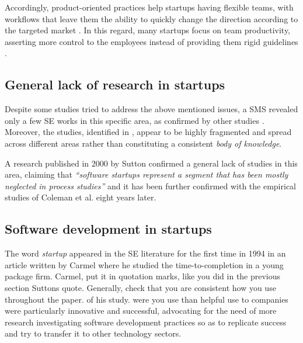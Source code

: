 \documentclass[12pt,journal,compsoc]{../sty/IEEEtran}
\begin{document}
Accordingly, product-oriented practices help startups having flexible teams,
with workflows that leave them the ability to quickly change the direction
according to the targeted market  \cite{Heitlager2007,Sutton2000}. In this
regard, many startups focus on team productivity, asserting more control to the
employees instead of providing them rigid guidelines \cite{Tanabian2005,
Chorev2006, Kakati2003}.

\subsection{General lack of research in startups} Despite some studies tried to
address the above mentioned issues, a SMS  \cite{SMS} revealed only a few SE
works in this specific area, as confirmed by  other studies \cite{Coleman2008,
Coleman2008a, Coleman2007, Sutton2000}.  Moreover, the studies, identified in
\cite{SMS}, appear to be highly fragmented  and spread across different areas
rather than constituting a consistent  \textit{body of knowledge}.

A research published in 2000 by Sutton \cite{Sutton2000} confirmed a general
lack of  studies in this area, claiming that \textit{``software startups
represent a segment that has been mostly neglected in process studies''} and it
has been further confirmed with the empirical studies of Coleman et al.
\cite{Coleman2008,Coleman2008a,Coleman2007} eight years later.

\subsection{Software development in startups}

The word \textit{startup} appeared in the SE literature for the first time in
1994 in an article written by Carmel \cite{Camel1994a} where he studied the
time-to-completion in a young package firm. %
Carmel, put it in quotation marks, like you did in the previous section  %
Suttons quote. Generally, check that you are consistent how you use  %
throughout the paper.  %
of his study.  %
were you use  %
than helpful  %
use to  %
companies were particularly innovative and successful,  advocating for the need
of more research investigating software development  practices so as to
replicate success and try to transfer it to other technology  sectors.
\end{document}
